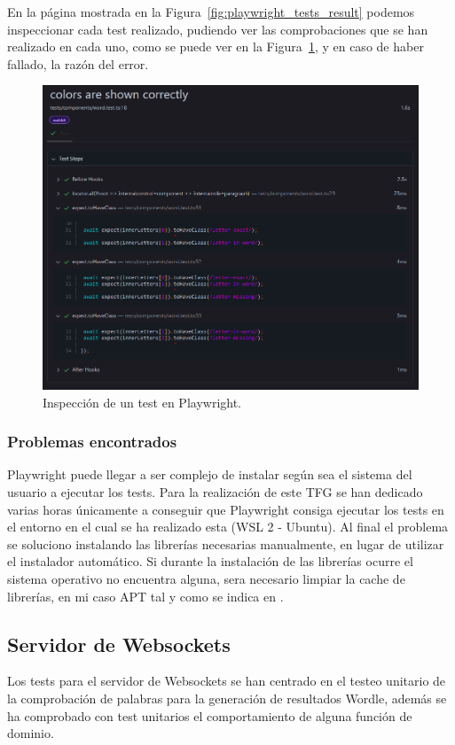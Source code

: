 En la página mostrada en la Figura~\ref{fig:playwright_tests_result} podemos inspeccionar cada test realizado, pudiendo ver las comprobaciones que se han realizado en cada uno, como se puede ver en la Figura~\ref{fig:playwright_test_result}, y en caso de haber fallado, la razón del error.

\begin{figure}[H]
	\centering
	\includegraphics[clip=true, width=\textwidth]{images/tests/playwright_one_test.png}
	\caption{Inspección de un test en Playwright.}
	\label{fig:playwright_test_result}
\end{figure}

\subsubsection{Problemas encontrados}
Playwright puede llegar a ser complejo de instalar según sea el sistema del usuario a ejecutar los tests. Para la realización de este TFG se han dedicado varias horas únicamente a conseguir que Playwright consiga ejecutar los tests en el entorno en el cual se ha realizado esta (WSL 2 - Ubuntu). Al final el problema se soluciono instalando las librerías necesarias manualmente, en lugar de utilizar el instalador automático. Si durante la instalación de las librerías ocurre el sistema operativo no encuentra alguna, sera necesario limpiar la cache de librerías, en mi caso APT tal y como se indica en \cite{playwright_lib_error}.

\subsection{Servidor de Websockets}
Los tests para el servidor de Websockets se han centrado en el testeo unitario de la comprobación de palabras para la generación de resultados Wordle, además se ha comprobado con test unitarios el comportamiento de alguna función de dominio.

